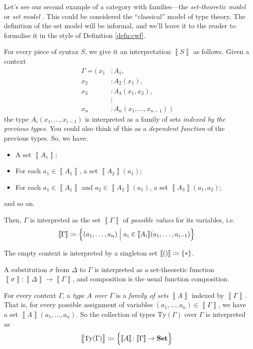\documentclass{article}
\theoremstyle{definition}
\renewcommand{\int}[1]{\mathopen{}\left\llbracket #1
    \right\rrbracket\mathclose{}}       %
\newcommand{\emp}{()}%
\newcommand{\Set}{\mathbf{Set}}
\newcommand{\Ty}{\mathrm{Ty}}
\newcommand{\defeq}{
	\mathrel{\mathrel{\mathop:}\mkern-1.2mu=}}	%
\newcommand{\n}{%
}                %
\begin{document}
Let's see our second example of a category with families---the \textit{set-theoretic model} or \textit{set model} \cite{coquand}. This could be considered the ``classical'' model of type theory. The definition of the set model will be informal, and we'll leave it to the reader to formalise it in the style of Definition \ref{defn:cwf}.

For every piece of syntax $S$, we give it an interpretation $\int{S}$ as follows. Given a context\vspace{-3mm}
\begin{align*}
    \Gamma = \big(\
    x_1 &: A_1,\\
    x_2 &: A_2(x_1),\\
    x_3 &: A_3(x_1,x_2),\\
    &\mathrel{\vdots}\\
    x_n &: A_n(x_1,\ldots,x_{n-1})\ \big)
\end{align*}
the type $A_i(x_1,\ldots,x_{i-1})$ is interpreted as a family of sets \textit{indexed by the previous types.} You could also think of this as a \textit{dependent function} of the previous types. So, we have:
\begin{itemize}
    \item A set $\int{A_1}$;
    
    \item For each $a_1 \in \int{A_1}$, a set $\int{A_2}\n(a_1)$;
    
    \item For each $a_1 \in \int{A_1}$ and $a_2 \in \int{A_2}\n(a_1)$, a set $\int{A_3}\n(a_1,a_2)$;
\end{itemize}
and so on.

Then, $\Gamma$ is interpreted as the set $\int{\Gamma}$ of \textit{possible values} for its variables, i.e. $$\int{\Gamma} \defeq \Big\{ (a_1,\ldots,a_n) \mathrel{\Big|} a_i \in \int{A_i}\n(a_1,\ldots,a_{i-1}) \Big\}$$

The empty context is interpreted by a singleton set $\int{\emp} \defeq \{ * \}$.

A substitution $\sigma$ from $\Delta$ to $\Gamma$ is interpreted as a set-theoretic function $\int{\sigma}\colon \int{\Delta} \to \int{\Gamma}$, and composition is the usual function composition.

For every context $\Gamma$, a \textit{type $A$ over $\Gamma$} is a \textit{family of sets} $\int{A}$ indexed by $\int{\Gamma}$. That is, for every possible assignment of variables $(a_1,\ldots,a_n) \in \int{\Gamma}$, we have a set $\int{A}\n(a_1,\ldots,a_n)$. So the collection of types $\Ty(\Gamma)$ over $\Gamma$ is interpreted as $$\int{\big.\Ty(\Gamma)} \defeq \Big\{ \int{A}\colon \int{\Gamma} \to \Set \Big\}$$
\end{document}
